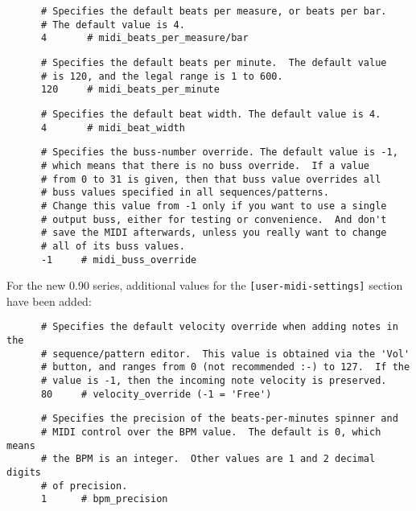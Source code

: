    \begin{verbatim}
      # Specifies the default beats per measure, or beats per bar.
      # The default value is 4.
      4       # midi_beats_per_measure/bar
   \end{verbatim}

   \begin{verbatim}
      # Specifies the default beats per minute.  The default value
      # is 120, and the legal range is 1 to 600.
      120     # midi_beats_per_minute
   \end{verbatim}

   \begin{verbatim}
      # Specifies the default beat width. The default value is 4.
      4       # midi_beat_width
   \end{verbatim}

   \begin{verbatim}
      # Specifies the buss-number override. The default value is -1,
      # which means that there is no buss override.  If a value
      # from 0 to 31 is given, then that buss value overrides all
      # buss values specified in all sequences/patterns.
      # Change this value from -1 only if you want to use a single
      # output buss, either for testing or convenience.  And don't
      # save the MIDI afterwards, unless you really want to change
      # all of its buss values.
      -1     # midi_buss_override
   \end{verbatim}

   For the new 0.90 series, additional values for the
   \texttt{[user-midi-settings]} section have been added:

   \begin{verbatim}
      # Specifies the default velocity override when adding notes in the
      # sequence/pattern editor.  This value is obtained via the 'Vol'
      # button, and ranges from 0 (not recommended :-) to 127.  If the
      # value is -1, then the incoming note velocity is preserved.
      80     # velocity_override (-1 = 'Free')
   \end{verbatim}

   \begin{verbatim}
      # Specifies the precision of the beats-per-minutes spinner and
      # MIDI control over the BPM value.  The default is 0, which means
      # the BPM is an integer.  Other values are 1 and 2 decimal digits
      # of precision.
      1      # bpm_precision
   \end{verbatim}

